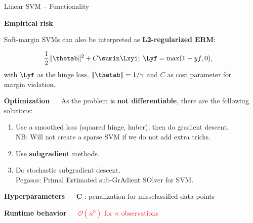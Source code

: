 \documentclass[11pt,compress,t,notes=noshow, xcolor=table]{beamer}
\newcommand{\highlight}[1]{\textcolor{highlightcol}{\textbf{#1}}}
\begin{document}
\begin{frame}{Linear SVM -- Functionality}

\footnotesize

\highlight{Empirical risk}

Soft-margin SVMs can also be interpreted as \textbf{L2-regularized ERM}: 

$$ \frac{1}{2} \|\thetab\|^2 + C \sumin \Lxyi ;\; \Lyf = \max(1-yf, 0),$$ 
with $\Lyf$ as the hinge loss, $\|\thetab\| = 1 / \gamma$ and $C$ as cost parameter for margin violation.

\medskip

\highlight{Optimization} ~~
As the problem is \textbf{not differentiable}, there are the following solutions: 
\begin{enumerate}
\item Use a smoothed loss (squared hinge, huber), then do gradient descent.\\
  NB: Will not  create a sparse SVM if we do not add extra tricks.
\item Use \textbf{subgradient} methods.
\item Do stochastic subgradient descent.\\
  Pegasos: Primal Estimated sub-GrAdient SOlver for SVM.
\end{enumerate}

\medskip

\highlight{Hyperparameters} ~~ \textbf{C} : penalization for missclassified data points 


\medskip
\highlight{Runtime behavior} ~~ \textcolor{red}{$\mathcal{O}(n^3)$ for $n$ observations} %

\end{frame}

\end{document}
